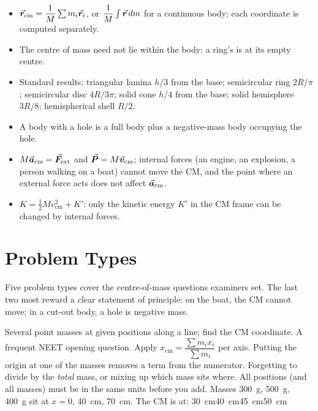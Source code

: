 \begin{itemize}
\item $\vec{\bm{r}}_{\text{cm}}=\dfrac1M\sum m_i\vec{\bm{r}}_i$, or $\dfrac1M\int\vec{\bm{r}}\,dm$ for a continuous body; each coordinate
      is computed separately.
\item The centre of mass need not lie within the body: a ring's is at its empty centre.
\item Standard results: triangular lamina $h/3$ from the base; semicircular ring $2R/\pi$; semicircular disc
      $4R/3\pi$; solid cone $h/4$ from the base; solid hemisphere $3R/8$; hemispherical shell $R/2$.
\item A body with a hole is a full body plus a negative-mass body occupying the hole.
\item $M\vec{\bm{a}}_{\text{cm}}=\vec{\bm{F}}_{\text{ext}}$ and $\vec{\bm{P}}=M\vec{\bm{v}}_{\text{cm}}$; internal forces (an engine, an
      explosion, a person walking on a boat) cannot move the CM, and the point where an external force acts does not affect $\vec{\bm{a}}_{\text{cm}}$.
\item $K=\tfrac12Mv_{\text{cm}}^2+K'$: only the kinetic energy $K'$ in the CM frame can be changed by internal forces.
\end{itemize}

\section{Problem Types}\label{sec:types13}
Five problem types cover the centre-of-mass questions examiners set. The last two most reward a clear
statement of principle: on the boat, the CM cannot move; in a cut-out body, a hole is negative mass.

{Several point masses at given positions along a line; find the CM coordinate. A frequent NEET
opening question.}
{Apply $x_{\text{cm}}=\dfrac{\sum m_i x_i}{\sum m_i}$ per axis. Putting the origin at one of the masses removes a term from the numerator.}
{Forgetting to divide by the \emph{total} mass, or mixing up which mass sits where. All positions (and all masses) must be in the same units
before you add.}
{Masses \SI{300}{g}, \SI{500}{g}, \SI{400}{g} sit at $x=0$, \SI{40}{cm}, \SI{70}{cm}. The CM is at:}
{\SI{30}{cm}}{\SI{40}{cm}}{\SI{45}{cm}}{\SI{50}{cm}}

